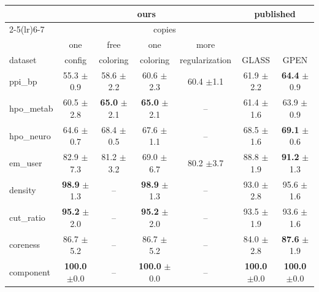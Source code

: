 \documentclass[11pt]{article}
\begin{document}
\begin{table}[H]
\centering
\small
\begin{tabular}{lcccc|cc}
\toprule
 & \multicolumn{4}{c|}{ours} & \multicolumn{2}{c}{published} \\
\cmidrule(lr){2-5}\cmidrule(lr){6-7}
 & & \multicolumn{3}{c|}{copies} & & \\
 & one & free & one & more & & \\
dataset & config & coloring & coloring & regularization & GLASS & GPEN \\
\midrule
ppi\_bp    & 55.3 {\scriptsize $\pm$0.9} & 58.6 {\scriptsize $\pm$2.2} & 60.6 {\scriptsize $\pm$2.3} & 60.4 {\scriptsize $\pm$1.1} & 61.9 {\scriptsize $\pm$2.2} & \textbf{64.4} {\scriptsize $\pm$0.9} \\
hpo\_metab & 60.5 {\scriptsize $\pm$2.8} & \textbf{65.0} {\scriptsize $\pm$2.1} & \textbf{65.0} {\scriptsize $\pm$2.1} & -- & 61.4 {\scriptsize $\pm$1.6} & 63.9 {\scriptsize $\pm$0.9} \\
hpo\_neuro & 64.6 {\scriptsize $\pm$0.7} & 68.4 {\scriptsize $\pm$0.5} & 67.6 {\scriptsize $\pm$1.1} & -- & 68.5 {\scriptsize $\pm$1.6} & \textbf{69.1} {\scriptsize $\pm$0.6} \\
em\_user   & 82.9 {\scriptsize $\pm$7.3} & 81.2 {\scriptsize $\pm$3.2} & 69.0 {\scriptsize $\pm$6.7} & 80.2 {\scriptsize $\pm$3.7} & 88.8 {\scriptsize $\pm$1.9} & \textbf{91.2} {\scriptsize $\pm$1.3} \\
density    & \textbf{98.9} {\scriptsize $\pm$1.3} & -- & \textbf{98.9} {\scriptsize $\pm$1.3} & -- & 93.0 {\scriptsize $\pm$2.8} & 95.6 {\scriptsize $\pm$1.6} \\
cut\_ratio & \textbf{95.2} {\scriptsize $\pm$2.0} & -- & \textbf{95.2} {\scriptsize $\pm$2.0} & -- & 93.5 {\scriptsize $\pm$1.9} & 93.6 {\scriptsize $\pm$1.6} \\
coreness   & 86.7 {\scriptsize $\pm$5.2} & -- & 86.7 {\scriptsize $\pm$5.2} & -- & 84.0 {\scriptsize $\pm$2.8} & \textbf{87.6} {\scriptsize $\pm$1.9} \\
component  & \textbf{100.0} {\scriptsize $\pm$0.0} & -- & \textbf{100.0} {\scriptsize $\pm$0.0} & -- & \textbf{100.0} {\scriptsize $\pm$0.0} & \textbf{100.0} {\scriptsize $\pm$0.0} \\
\bottomrule
\end{tabular}
\end{table}
\end{document}
